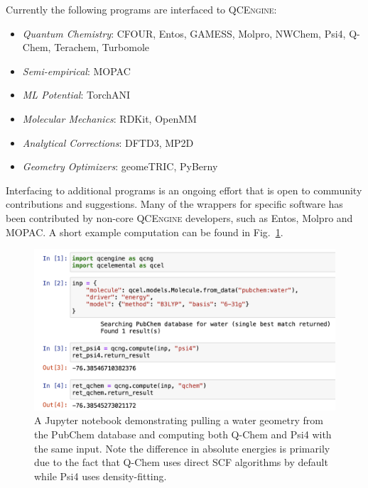 \documentclass[journal=jctcce,manuscript=article]{achemso}
\newcommand{\qcngN}{QCEngine}
\newcommand{\qcng}{{\textsc{\qcngN}}\xspace}%
\begin{document}
Currently the following programs are interfaced to \qcng:

\begin{itemize}
     \item {\it Quantum Chemistry}:
     CFOUR,\cite{WEB19:cfour}
     Entos,\cite{Manby:2019:entos} 
     GAMESS,\cite{Barca:2020:gamess}
     Molpro,\cite{WEB20:molpro,MOLPRO-WIREs}
     NWChem,\cite{Apra:2020:nwchem}
     Psi4,\cite{Parrish:2017:3185,Smith:2020:psi4}
     Q-Chem,\cite{Shao:2015:184}
     Terachem,\cite{Ufimtsev:2009:2619}
     Turbomole\cite{Furche:2014:91}
     \item {\it Semi-empirical}:
     MOPAC\cite{WEB20:mopac}
     \item {\it ML Potential}:
     TorchANI\cite{GH20:torchani, Smith:2017:3192}
     \item {\it Molecular Mechanics}:
     RDKit,\cite{GH20:rdkit}
     OpenMM\cite{Eastman:2017:1}
     \item {\it Analytical Corrections}:
     DFTD3,\cite{GH20:dftd3, Grimme:2010:154104}
     MP2D\cite{GH20:mp2d, Rezac:2018:4711}
     \item {\it Geometry Optimizers}:
     geomeTRIC,\cite{GH20:geometric, Wang:2016:214108}
     PyBerny\cite{GH20:pyberny}
\end{itemize}

Interfacing to additional programs is an ongoing effort that is open to community contributions and suggestions.
Many of the wrappers for specific software has been contributed by non-core \qcng developers, such as Entos, Molpro and MOPAC.
A short example computation can be found in Fig.~\ref{fig:qcengine}.

\begin{figure}[H]
    \centering
    \includegraphics[width=\columnwidth]{./images/QCEngineImage.png}
    \caption{A Jupyter notebook demonstrating pulling a water geometry from the PubChem database\cite{10.1093/nar/gky1033} and computing both Q-Chem and Psi4 with the same input. Note the difference in absolute energies is primarily due to the fact that Q-Chem uses direct SCF algorithms by default while Psi4 uses density-fitting.}
    \label{fig:qcengine}
\end{figure}
\end{document}
